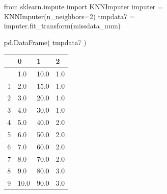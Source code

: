 \documentclass[
  a4paper,
  DIV=11,
  numbers=noendperiod]{scrreprt}
\newenvironment{Shaded}{\begin{snugshade}}{\end{snugshade}}
\newcommand{\DecValTok}[1]{\textcolor[rgb]{0.68,0.00,0.00}{#1}}
\newcommand{\ImportTok}[1]{\textcolor[rgb]{0.00,0.46,0.62}{#1}}
\newcommand{\NormalTok}[1]{\textcolor[rgb]{0.00,0.23,0.31}{#1}}
\newcommand{\OperatorTok}[1]{\textcolor[rgb]{0.37,0.37,0.37}{#1}}
\begin{document}
\begin{Shaded}
\begin{Highlighting}[]
\ImportTok{from}\NormalTok{ sklearn.impute }\ImportTok{import}\NormalTok{ KNNImputer}
\NormalTok{imputer }\OperatorTok{=}\NormalTok{ KNNImputer(n\_neighbors}\OperatorTok{=}\DecValTok{2}\NormalTok{)}
\NormalTok{tmpdata7 }\OperatorTok{=}\NormalTok{ imputer.fit\_transform(missdata\_num)}
\end{Highlighting}
\end{Shaded}

\begin{Shaded}
\begin{Highlighting}[]
\NormalTok{pd.DataFrame( tmpdata7 )}
\end{Highlighting}
\end{Shaded}

\begin{longtable}[]{@{}llll@{}}
\toprule\noalign{}
& 0 & 1 & 2 \\
\midrule\noalign{}
\endhead
\bottomrule\noalign{}
\endlastfoot
0 & 1.0 & 10.0 & 1.0 \\
1 & 2.0 & 15.0 & 1.0 \\
2 & 3.0 & 20.0 & 1.0 \\
3 & 4.0 & 30.0 & 1.0 \\
4 & 5.0 & 40.0 & 2.0 \\
5 & 6.0 & 50.0 & 2.0 \\
6 & 7.0 & 60.0 & 2.0 \\
7 & 8.0 & 70.0 & 2.0 \\
8 & 9.0 & 80.0 & 3.0 \\
9 & 10.0 & 90.0 & 3.0 \\
\end{longtable}
\end{document}
